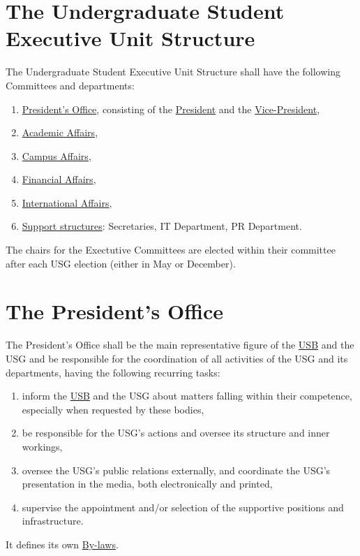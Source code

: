 \label{USGexecutiveUnitDef}

\section{The Undergraduate Student Executive Unit Structure} 
\label{USGstructure}
The Undergraduate Student Executive Unit Structure shall have the following Committees and departments:
\begin{enumerate}
\item \hyperref[PresidentOfficeDef]{President's Office}, consisting of the \hyperref[PresDef]{President} and the \hyperref[VPDef]{Vice-President},
\item \hyperref[AACdef]{Academic Affairs},
\item \hyperref[CACdef]{Campus Affairs},
\item \hyperref[Financesdef]{Financial Affairs},
\item \hyperref[IACdef]{International Affairs},
\item \hyperref[suppstrucdef]{Support structures}: Secretaries, IT Department, PR Department.
\end{enumerate}
The chairs for the Exectutive Committees are elected within their committee after each USG election (either in May or December).


\section{The President's Office} 
\label{PresidentOfficeDef}
The President's Office shall be the main representative figure of the \hyperref[studentbody]{USB} and the USG and be responsible for the coordination of all activities of the USG and its departments, having the following recurring tasks:
\begin{enumerate}
\item inform the \hyperref[studentbody]{USB} and the USG about matters falling within their competence, especially when requested by these bodies,
\item be responsible for the USG's actions and oversee its structure and inner workings,
\item oversee the USG's public relations externally, and coordinate the USG's presentation in the media, both electronically and printed,
\item supervise the appointment and/or selection of the supportive positions and infrastructure.
\end{enumerate}
It defines its own \hyperref[PresByLawsDef]{By-laws}.

